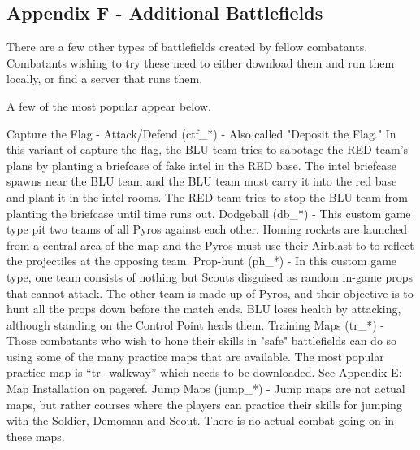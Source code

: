 \subsection{Appendix F - Additional Battlefields}
There are a few other types of battlefields created by fellow combatants.  Combatants wishing to try these need to either download them and run them locally, or find a server that runs them.

A few of the most popular appear below.

Capture the Flag - Attack/Defend (ctf\_*) - Also called "Deposit the Flag." In this variant of capture the flag, the BLU team tries to sabotage the RED team's plans by planting a briefcase of fake intel in the RED base. The intel briefcase spawns near the BLU team and the BLU team must carry it into the red base and plant it in the intel rooms. The RED team tries to stop the BLU team from planting the briefcase until time runs out.
Dodgeball (db\_*) - This custom game type pit two teams of all Pyros against each other. Homing rockets are launched from a central area of the map and the Pyros must use their Airblast to to reflect the projectiles at the opposing team.
Prop-hunt (ph\_*) - In this custom game type, one team consists of nothing but Scouts disguised as random in-game props that cannot attack. The other team is made up of Pyros, and their objective is to hunt all the props down before the match ends. BLU loses health by attacking, although standing on the Control Point heals them.
Training Maps (tr\_*) - Those combatants who wish to hone their skills in "safe" battlefields can do so using some of the many practice maps that are available.  The most popular practice map is “tr\_walkway” which needs to be downloaded.  See Appendix E: Map Installation on {{pageref}}.
Jump Maps (jump\_*) - Jump maps are not actual maps, but rather courses where the players can practice their skills for jumping with the Soldier, Demoman and Scout. There is no actual combat going on in these maps.